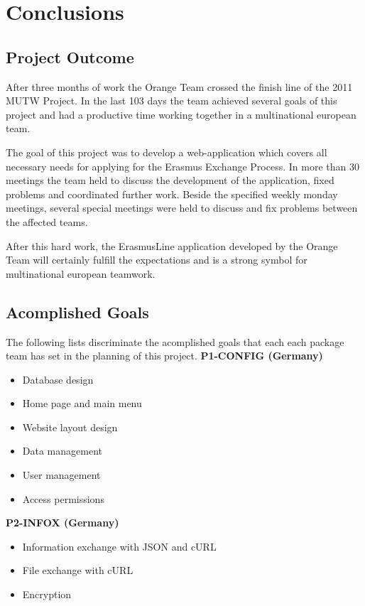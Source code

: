 \chapter{Conclusions}
\section{Project Outcome}
After three months of work the Orange Team crossed the finish
line of the 2011 MUTW Project. In the last 103 days the team achieved several goals of this
project and had a productive time working together in a multinational european
team.

The goal of this project was to develop a web-application which covers
all necessary needs for applying for the Erasmus Exchange Process. In more than
30 meetings the team held to discuss the development of the application, fixed
problems and coordinated further work. Beside the specified weekly monday
meetings, several special meetings were held to discuss and fix problems between
the affected teams.

After this hard work, the ErasmusLine application developed
by the Orange Team will certainly fulfill the expectations and is a strong
symbol for multinational european teamwork.

\section{Acomplished Goals}
The following lists discriminate the acomplished goals that each each package
team has set in the planning of this project.
\newline
\textbf{P1-CONFIG (Germany)}
\begin{itemize}
  \item Database design
  \item Home page and main menu
  \item Website layout design
  \item Data management
  \item User management
  \item Access permissions
\end{itemize}


\textbf{P2-INFOX (Germany)}
\begin{itemize}
  \item Information exchange with JSON and cURL
  \item File exchange with cURL
  \item Encryption
\end{itemize}


